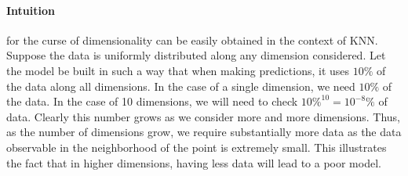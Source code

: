 \documentclass[11pt, a4paper]{article}
\begin{document}
    \paragraph{Intuition}
    for the curse of dimensionality can be easily obtained in the context of KNN.\newline
    Suppose the data is uniformly distributed along any dimension considered. Let the model be built in such a way that when making predictions, it uses $10\%$ of the data along all dimensions. \newline
    In the case of a single dimension, we need $10\%$ of the data. In the case of 10 dimensions, we will need to check $10\% ^{10} = 10^{-8}\%$ of data. Clearly this number grows as we consider more and more dimensions.\newline
    Thus, as the number of dimensions grow, we require substantially more data as the data observable in the neighborhood of the point is extremely small. This illustrates the fact that in higher dimensions, having less data will lead to a poor model.
\end{document}
